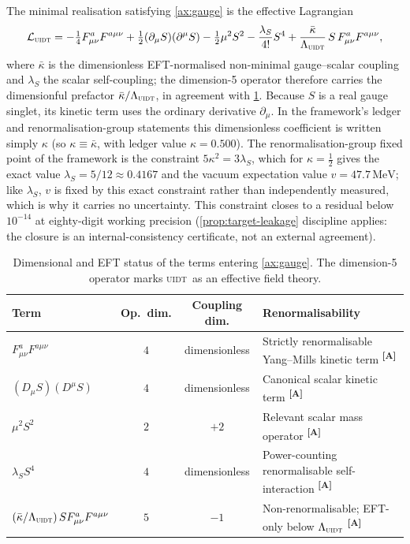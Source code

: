 \documentclass[12pt,a4paper,twoside]{article}
\theoremstyle{plain}
\theoremstyle{definition}
\theoremstyle{remark}
\newcommand{\UIDT}{\textsc{uidt}}
\newcommand{\MeV}{\,\mathrm{MeV}}
\newcommand{\catmark}[1]{\textsuperscript{\textsf{\textbf{[#1]}}}}
\newcommand{\lambdaS}{5/12 \approx 0.4167} %
\newcommand{\kappaVal}{0.500} %
\newcommand{\vVEV}{47.7\MeV} %
\begin{document}
\noindent The minimal realisation satisfying \cref{ax:gauge} is the effective Lagrangian
\begin{equation}
 \mathcal{L}_{\UIDT}
 = -\tfrac{1}{4}F_{\mu\nu}^a F^{a\mu\nu}
 + \tfrac{1}{2}(\partial_\mu S)(\partial^\mu S)
 - \tfrac{1}{2}\mu^2 S^2
 - \frac{\lambda_S}{4!}S^4
 + \frac{\bar\kappa}{\Lambda_{\UIDT}}\,S\,F_{\mu\nu}^a F^{a\mu\nu},
 \label{eq:lagrangian}
\end{equation}
where $\bar\kappa$ is the dimensionless EFT-normalised non-minimal gauge--scalar coupling and $\lambda_S$ the scalar self-coupling; the dimension-5 operator therefore carries the dimensionful prefactor $\bar\kappa/\Lambda_{\UIDT}$, in agreement with \cref{tab:eft-dimensions}. Because $S$ is a real gauge singlet, its kinetic term uses the ordinary derivative $\partial_\mu$. In the framework's ledger and renormalisation-group statements this dimensionless coefficient is written simply $\kappa$ (so $\kappa\equiv\bar\kappa$, with ledger value $\kappa=\kappaVal$). The renormalisation-group fixed point of the framework is the constraint $5\kappa^2 = 3\lambda_S$, which for $\kappa = \tfrac{1}{2}$ gives the exact value $\lambda_S = \lambdaS$ and the vacuum expectation value $v = \vVEV$; like $\lambda_S$, $v$ is fixed by this exact constraint rather than independently measured, which is why it carries no uncertainty. This constraint closes to a residual below $10^{-14}$ at eighty-digit working precision (\cref{prop:target-leakage} discipline applies: the closure is an internal-consistency certificate, not an external agreement).

\begin{table}[H]
\centering
\scriptsize
\caption{Dimensional and EFT status of the terms entering \cref{ax:gauge}.
The dimension-5 operator marks \UIDT\ as an effective field theory.}
\label{tab:eft-dimensions}
\renewcommand{\arraystretch}{1.25}
\begin{tabular}{p{} c c p{}}
\toprule
\textbf{Term} & \textbf{Op.\ dim.} & \textbf{Coupling dim.} & \textbf{Renormalisability} \\
\midrule
$F_{\mu\nu}^a F^{a\mu\nu}$ & $4$ & dimensionless & Strictly renormalisable Yang--Mills kinetic term \catmark{A} \\
$(D_\mu S)(D^\mu S)$ & $4$ & dimensionless & Canonical scalar kinetic term \catmark{A} \\
$\mu^2 S^2$ & $2$ & $+2$ & Relevant scalar mass operator \catmark{A} \\
$\lambda_S S^4$ & $4$ & dimensionless & Power-counting renormalisable self-interaction \catmark{A} \\
$(\bar\kappa/\Lambda_{\UIDT})\,S F_{\mu\nu}^a F^{a\mu\nu}$ & $5$ & $-1$ & Non-renormalisable; EFT-only below $\Lambda_{\UIDT}$ \catmark{A} \\
\bottomrule
\end{tabular}
\end{table}
\end{document}
